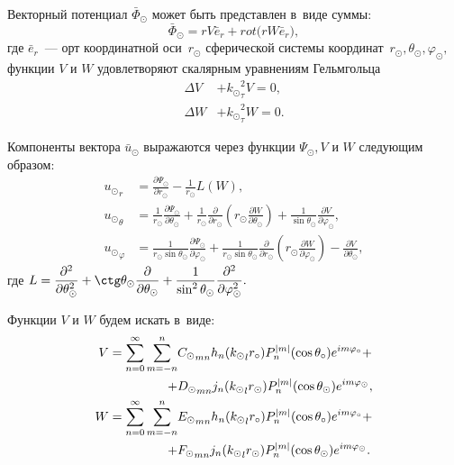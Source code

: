 Векторный потенциал $\bar{\Phi}_\odot$ может быть представлен в~виде суммы:
$$
\bar{\Phi}_\odot = rV\bar{e}_r +  rot\bigl(rW\bar{e}_r\bigr),
$$
где $\bar{e}_r$~--- орт координатной оси~$r_\odot$ сферической системы координат~$r_\odot, \theta_\odot, \varphi_\odot,$\\
функции $V$ и $W$ удовлетворяют скалярным уравнениям Гельмгольца
\begin{align}
\Delta V &+ {k_\odot}_\tau^2 V = 0,\label{eq_V}\\
\Delta W &+ {k_\odot}_\tau^2 W = 0.\label{eq_W}
\end{align}

Компоненты вектора $\bar{u}_\odot$ выражаются через функции $\Psi_\odot, V$ и $W$ следующим образом:
\begin{equation}\label{eq_us}
\begin{split}
{u_\odot}_r &= \frac{\partial \Psi_\odot}{\partial r_\odot} - \frac{1}{r_\odot}L(W),\\
{u_\odot}_\theta &= \frac{1}{r_\odot}\frac{\partial \Psi_\odot}{\partial \theta_\odot} + \frac{1}{r_\odot}\frac{\partial}{\partial r_\odot}\left(r_\odot\frac{\partial W}{\partial \theta_\odot}\right) + \frac{1}{\sin\theta_\odot}\frac{\partial V}{\partial\varphi_\odot},\\
{u_\odot}_\varphi &= \frac{1}{r_\odot \sin\theta_\odot}\frac{\partial \Psi_\odot}{\partial \varphi_\odot} + \frac{1}{r_\odot\sin\theta_\odot}\frac{\partial}{\partial r_\odot}\left(r_\odot\frac{\partial W}{\partial \varphi_\odot}\right) - \frac{\partial V}{\partial \theta_\odot},
\end{split}
\end{equation}
где $L = \dfrac{\partial^2}{\partial\theta_\odot^2} + \ctg\theta_\odot\dfrac{\partial}{\partial\theta_\odot} + \dfrac{1}{\sin^2\theta_\odot}\dfrac{\partial^2}{\partial\varphi_\odot^2}.$

Функции $V$ и $W$ будем искать в~виде:
\begin{align}
V = \sum\limits_{n=0}^\infty \sum\limits_{m=-n}^n &{C_\odot}_{mn} h_n({k_\odot}_lr_\circ)P_n^{\lvert m\rvert}(\cos\theta_\circ) e^{im\varphi_\circ} + \notag\\
+ &{D_\odot}_{mn} j_n({k_\odot}_lr_\odot)P_n^{\lvert m\rvert}(\cos\theta_\odot) e^{im\varphi_\odot},\label{eq_v}\\
W = \sum\limits_{n=0}^\infty \sum\limits_{m=-n}^n &{E_\odot}_{mn} h_n({k_\odot}_lr_\circ)P_n^{\lvert m\rvert}(\cos\theta_\circ) e^{im\varphi_\circ} + \notag\\
+ &{F_\odot}_{mn} j_n({k_\odot}_lr_\odot)P_n^{\lvert m\rvert}(\cos\theta_\odot) e^{im\varphi_\odot}.\label{eq_w}
\end{align}

